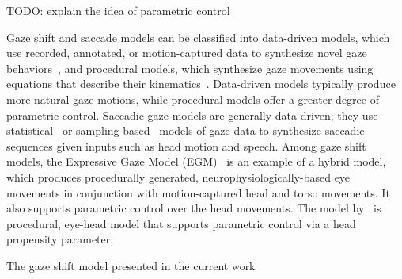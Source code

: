 TODO: explain the idea of parametric control

Gaze shift and saccade models can be classified into data-driven models, which use recorded, annotated, or motion-captured data to synthesize novel gaze behaviors~\cite{heck2007automated,lance2010expressive,lee2002eyes,deng2005automated,le2012live}, and procedural models, which synthesize gaze movements using equations that describe their kinematics~\cite{peters2010animating,thiebaux2009realtime}. Data-driven models typically produce more natural gaze motions, while procedural models offer a greater degree of parametric control. Saccadic gaze models are generally data-driven; they use statistical~\cite{le2012live,lee2002eyes} or sampling-based~\cite{deng2005automated} models of gaze data to synthesize saccadic sequences given inputs such as head motion and speech. Among gaze shift models, the Expressive Gaze Model (EGM)~\cite{lance2010expressive} is an example of a hybrid model, which produces procedurally generated, neurophysiologically-based eye movements in conjunction with motion-captured head and torso movements. It also supports parametric control over the head movements. The model by~\citet{peters2010animating} is procedural, eye-head model that supports parametric control via a head propensity parameter.

The gaze shift model presented in the current work


